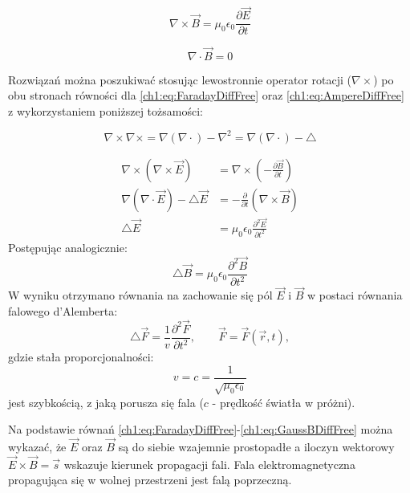 \begin{equation}
\nabla\times\vec{B} = \mu_0\epsilon_0\frac{\partial\vec{E}}{\partial t}
\label{ch1:eq:AmpereDiffFree}
\end{equation}

\begin{equation}
\nabla\cdot\vec{B} = 0
\label{ch1:eq:GaussBDiffFree}
\end{equation}


Rozwiązań można poszukiwać stosując lewostronnie operator rotacji ($\nabla\times$) po obu stronach równości dla \eqref{ch1:eq:FaradayDiffFree} oraz \eqref{ch1:eq:AmpereDiffFree} z wykorzystaniem poniższej tożsamości:

\begin{equation}
\nabla\times\nabla\times = \nabla(\nabla\cdot) - \nabla^2 = \nabla(\nabla\cdot) - \triangle
\label{ch1:eq:rotrot}
\end{equation}

\begin{align}
\nabla\times\left( \nabla\times\vec{E} \right) &= \nabla\times\left( -\frac{\partial\vec{B}}{\partial t} \right)\nonumber\\
\nabla(\nabla\cdot\vec{E}) - \triangle\vec{E} &= -\frac{\partial}{\partial t}\left(\nabla\times\vec{B} \right)\nonumber\\
\triangle\vec{E} &= \mu_0\epsilon_0\frac{\partial^2\vec{E}}{\partial t^2}
\label{ch1:eq:ElectricWaveEq}
\end{align}
Postępując analogicznie:
\begin{equation}
\triangle\vec{B} = \mu_0\epsilon_0\frac{\partial^2\vec{B}}{\partial t^2}
\label{ch1:eq:MagneticWaveEq}
\end{equation}
W wyniku otrzymano równania na zachowanie się pól $\vec{E}$ i $\vec{B}$ w postaci równania falowego d'Alemberta:
\begin{equation}
\triangle\vec{F} = \frac{1}{v}\frac{\partial^2\vec{F}}{\partial t^2},\qquad \vec{F} = \vec{F}\left(\vec{r}, t \right),
\label{ch1:eq:dAlambertWaveEq}
\end{equation}
gdzie stała proporcjonalności:
\begin{equation}
v = c = \frac{1}{\sqrt{\mu_0\epsilon_0}}
\label{ch1:eq:speedOfLight}
\end{equation}
jest szybkością, z jaką porusza się fala ($c$ - prędkość światła w próżni).

Na podstawie równań \eqref{ch1:eq:FaradayDiffFree}-\eqref{ch1:eq:GaussBDiffFree} można wykazać, że $\vec{E}$ oraz $\vec{B}$ są do siebie wzajemnie prostopadłe a iloczyn wektorowy $\vec{E}\times\vec{B} = \vec{s}$ wskazuje kierunek propagacji fali. Fala elektromagnetyczna propagująca się w wolnej przestrzeni jest falą poprzeczną. 

